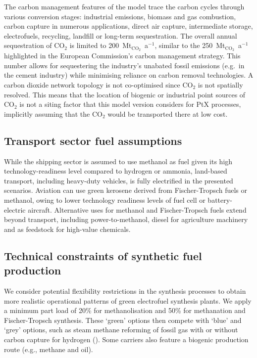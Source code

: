 The carbon management features of the model trace the carbon cycles through
various conversion stages: industrial emissions, biomass and gas combustion,
carbon capture in numerous applications, direct air capture, intermediate
storage, electrofuels, recycling, landfill or long-term sequestration. The
overall annual sequestration of CO$_2$ is limited to
200~Mt$_{\text{CO}_2}$~a$^{-1}$, similar to the 250~Mt$_{\text{CO}_2}$~a$^{-1}$
highlighted in the European Commission's carbon management
strategy.\cite{europeancommissionAmbitiousIndustrialCarbon2024} This number
allows for sequestering the industry's unabated fossil emissions (e.g.~in the
cement industry) while minimising reliance on carbon removal technologies. A
carbon dioxide network topology is not co-optimised since CO$_2$ is not
spatially resolved. This means that the location of biogenic or industrial point
sources of CO$_2$ is not a siting factor that this model version considers for
PtX processes, implicitly assuming that the CO$_2$ would be transported there at
low cost. \cite{hofmannDesigningCO22023,hofmannH2CO2Network2024}

\subsection*{Transport sector fuel assumptions}

While the shipping sector is assumed to use methanol as fuel given its high
technology-readiness level compared to hydrogen or
ammonia,\cite{ieaETPCleanEnergy2024} land-based transport, including heavy-duty
vehicles, is fully electrified in the presented
scenarios.\cite{linkRapidlyDecliningCosts2024} Aviation can use green kerosene
derived from Fischer-Tropsch fuels or methanol, owing to lower technology
readiness levels of fuel cell or battery-electric
aircraft.\cite{ieaETPCleanEnergy2024} Alternative uses for methanol and
Fischer-Tropsch fuels extend beyond transport, including
power-to-methanol,\cite{brownUltralongdurationEnergyStorage2023} diesel for
agriculture machinery and as feedstock for high-value chemicals.

\subsection*{Technical constraints of synthetic fuel production}

We consider potential flexibility restrictions in the synthesis processes to
obtain more realistic operational patterns of green electrofuel synthesis
plants. We apply a minimum part load of 20\% for methanolisation and 50\% for
methanation and Fischer-Tropsch
synthesis.\cite{mucciPowerXProcessesBased2023,wentrupDynamicOperationFischerTropsch2022,dieterichPowerliquidSynthesisMethanol2020,mbathaPowermethanolProcessReview2021}
These `green' options then compete with `blue' and `grey' options, such as steam
methane reforming of fossil gas with or without carbon capture for hydrogen
(). Some carriers also feature a
biogenic production route (e.g., methane and oil).

